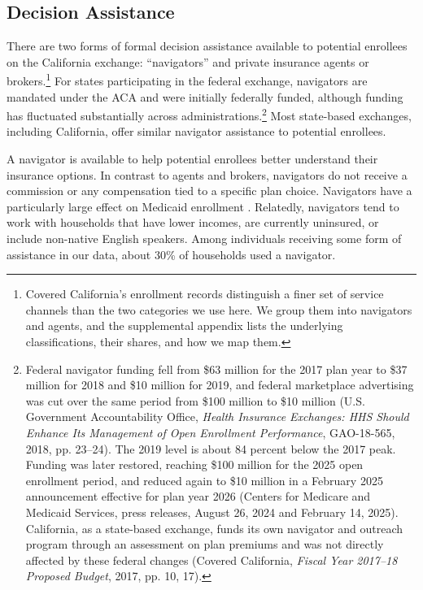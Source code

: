 \documentclass[12pt]{article}
\begin{document}
\subsection{Decision Assistance}
There are two forms of formal decision assistance available to potential enrollees on the California exchange: ``navigators'' and private insurance agents or brokers.\footnote{Covered California's enrollment records distinguish a finer set of service channels than the two categories we use here. We group them into navigators and agents, and the supplemental appendix lists the underlying classifications, their shares, and how we map them.} For states participating in the federal exchange, navigators are mandated under the ACA and were initially federally funded, although funding has fluctuated substantially across administrations.\footnote{Federal navigator funding fell from \$63 million for the 2017 plan year to \$37 million for 2018 and \$10 million for 2019, and federal marketplace advertising was cut over the same period from \$100 million to \$10 million (U.S. Government Accountability Office, \textit{Health Insurance Exchanges: HHS Should Enhance Its Management of Open Enrollment Performance}, GAO-18-565, 2018, pp. 23--24). The 2019 level is about 84 percent below the 2017 peak. Funding was later restored, reaching \$100 million for the 2025 open enrollment period, and reduced again to \$10 million in a February 2025 announcement effective for plan year 2026 (Centers for Medicare and Medicaid Services, press releases, August 26, 2024 and February 14, 2025). California, as a state-based exchange, funds its own navigator and outreach program through an assessment on plan premiums and was not directly affected by these federal changes (Covered California, \textit{Fiscal Year 2017--18 Proposed Budget}, 2017, pp. 10, 17).} Most state-based exchanges, including California, offer similar navigator assistance to potential enrollees.

A navigator is available to help potential enrollees better understand their insurance options. In contrast to agents and brokers, navigators do not receive a commission or any compensation tied to a specific plan choice. Navigators have a particularly large effect on Medicaid enrollment \citep{myerson2019, sommers2015, aizer2003}. Relatedly, navigators tend to work with households that have lower incomes, are currently uninsured, or include non-native English speakers. Among individuals receiving some form of assistance in our data, about 30\% of households used a navigator.
\end{document}
